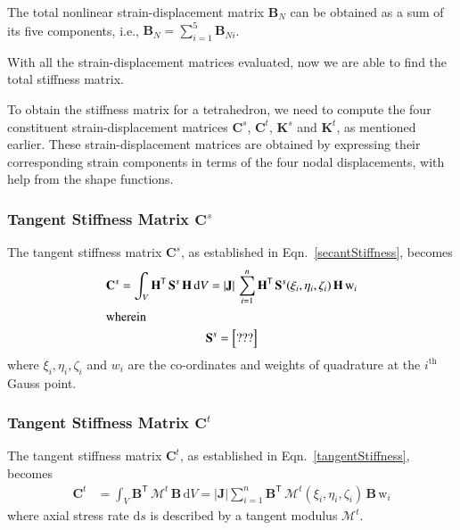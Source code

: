 The total nonlinear strain-displacement matrix $\mathbf{B}_N$ can be obtained as a sum of its five components, i.e., $\mathbf{B}_N = \sum_{i=1}^5 \mathbf{B}_{Ni}$.

With all the strain-displacement matrices evaluated, now we are able to find the total stiffness matrix.


To obtain the stiffness matrix for a tetrahedron, we need to compute the four constituent strain-displacement matrices $\mathbf{C}^s$, $\mathbf{C}^t$, $\mathbf{K}^s$ and $\mathbf{K}^t$, as mentioned earlier. These strain-displacement matrices are obtained by expressing their corresponding strain components in terms of the four nodal displacements, with help from the shape functions.

\subsubsection{Tangent Stiffness Matrix $\mathbf{C}^s$}

The tangent stiffness matrix $\mathbf{C}^s$, as established in Eqn.~\eqref{secantStiffness}, becomes 
\begin{subequations}
	\begin{gather}
		\mathbf{C}^s = \int_{V} \mathbf{H}^{\mathsf{T}} \,  \mathbf{S}^s \, \mathbf{H} \, \mathrm{d} V
		=  | \mathbf{J} |  \, \sum_{i=1}^{n}  \mathbf{H}^{\mathsf{T}} \, \mathbf{S}^s (\xi_i , \eta_i, \zeta_i) \, \mathbf{H} \, \mathrm{w}_i \\
        \intertext{wherein}
        \mathbf{S}^s = \begin{bmatrix} ??? \end{bmatrix}
	\end{gather}
\end{subequations}
where $\xi_i, \eta_i, \zeta_i$ and $w_i$ are the co-ordinates and weights of quadrature at the $i^{\mathrm{th}}$ Gauss point. 

\subsubsection{Tangent Stiffness Matrix $\mathbf{C}^t$}

The tangent stiffness matrix $\mathbf{C}^t$, as established in Eqn.~\eqref{tangentStiffness}, becomes
\begin{equation}
	\begin{aligned}
		\mathbf{C}^t & =\int_{V} \mathbf{B}^{\mathsf{T}} \,  \boldsymbol{\mathcal{M}}^t \, \mathbf{B}  \,  \mathrm{d} V
		= |\mathbf{J}| \sum_{i=1}^{n} \mathbf{B}^{\mathsf{T}} \, \boldsymbol{\mathcal{M}}^t (\xi_i, \eta_i, \zeta_i) \, \mathbf{B} \, \mathrm{w}_i
	\end{aligned}
\end{equation} 
where axial stress rate $\mathrm{d} s$ is described by a tangent modulus $\boldsymbol{\mathcal{M}}^{t}$.

